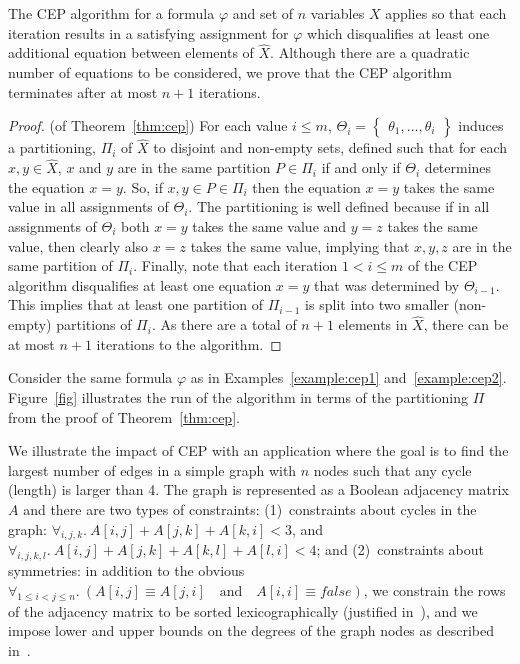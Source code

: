 \documentclass[runningheads,a4paper]{llncs}
\newcommand{\set}[1]{\left\{
      \begin{array}{l}\!\!#1\!\!\end{array}
      \right\}}
\newcommand{\false}{\mathit{false}}
\begin{document}
The CEP algorithm for a formula $\varphi$ and set of $n$ variables $X$
applies so that each iteration results in a satisfying assignment for
$\varphi$ which disqualifies at least one additional equation between
elements of $\hat X$. Although there are a quadratic number of
equations to be considered, we prove that the CEP algorithm terminates
after at most $n+1$ iterations.


\begin{proof} (of Theorem~\ref{thm:cep})
  For each value $i\leq m$, $\Theta_i= \set{\theta_1, \ldots,
    \theta_i}$ induces a partitioning, $\Pi_i$ of $\hat X$ to disjoint
  and non-empty sets, defined such that for each $x,y\in \hat X$, $x$
  and $y$ are in the same partition $P\in \Pi_i$ if and only if
  $\Theta_i$ determines the equation $x=y$. So, if $x,y\in P\in\Pi_i$
  then the equation $x=y$ takes the same value in all assignments of
  $\Theta_i$. The partitioning is well defined because if in all
  assignments of $\Theta_i$ both $x=y$ takes the same value and $y=z$
  takes the same value, then clearly also $x=z$ takes the same value,
  implying that $x,y,z$ are in the same partition of $\Pi_i$.
Finally, note that each iteration $1<i\leq m$ of the CEP algorithm
  disqualifies at least one equation $x=y$ that was determined by
  $\Theta_{i-1}$. This implies that at least one partition of
  $\Pi_{i-1}$ is split into two smaller (non-empty) partitions of
  $\Pi_{i}$. As there are a total of $n+1$ elements in $\hat X$, there
  can be at most $n+1$ iterations to the algorithm.
\end{proof}


\begin{example}\label{example:cep3}

  Consider the same formula $\varphi$ as in
  Examples~\ref{example:cep1}
  and~\ref{example:cep2}. Figure~\ref{fig}\;
  illustrates the run of the algorithm in terms of the partitioning
  $\Pi$ from the proof of Theorem~\ref{thm:cep}.

\end{example}


We illustrate the impact of CEP with an application where the goal is
to find the largest number of edges in a simple graph with $n$ nodes
such that any cycle (length) is larger than 4. The graph is
represented as a Boolean adjacency matrix $A$ and there are two types
of constraints: (1)~constraints about cycles in the graph:
$\forall_{i,j,k}.~ A[i,j]+A[j,k]+A[k,i] < 3$, and
$\forall_{i,j,k,l}.~A[i,j]+A[j,k]+A[k,l] + A[l,i] < 4$; and
(2)~constraints about symmetries: in addition to the obvious
$\forall_{1\leq i<j\leq n}.~(A[i,j]\equiv A[j,i] \mbox{~~ and~~ }
A[i,i]\equiv\false)$, we constrain the rows of the adjacency matrix to
be sorted lexicographically (justified in~\cite{cmps:ijcai13}), and we
impose lower and upper bounds on the degrees of the graph nodes as
described in~\cite{Garnick93}.
\end{document}
